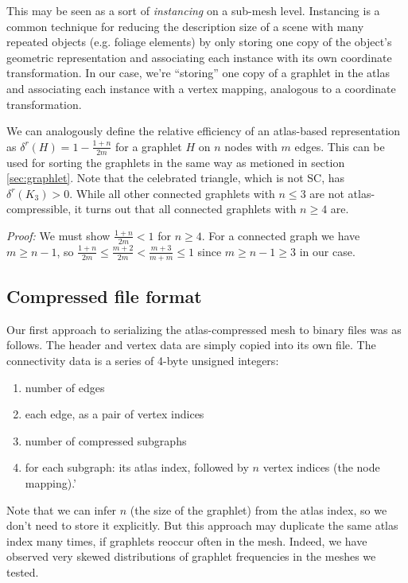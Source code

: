 \documentclass{egpubl}
\begin{document}
This may be seen as a sort of \textit{instancing} on a sub-mesh level. Instancing is a common technique for reducing the description size of a scene with many repeated objects (e.g. foliage elements) by only storing one copy of the object's geometric representation and associating each instance with its own coordinate transformation. In our case, we're ``storing'' one copy of a graphlet in the atlas and associating each instance with a vertex mapping, analogous to a coordinate transformation.

We can analogously define the relative efficiency of an atlas-based representation as
$\delta^r(H) = 1 - \frac{1+n}{2m}$ for a graphlet $H$ on $n$ nodes with $m$ edges. This can be used for sorting the graphlets in the same way as metioned in section \ref{sec:graphlet}.
Note that the celebrated triangle, which is not SC, has $\delta^r(K_3) > 0$.
While all other connected graphlets with $n \leq 3$ are not atlas-compressible, it turns out that all connected graphlets with $n \geq 4$ are.

\textit{Proof:}
We must show $\frac{1 + n}{2m} < 1$ for $n \geq 4$. For a connected graph we have $m \geq n - 1$, so $\frac{1 + n}{2m} \leq \frac{m + 2}{2m} < \frac{m + 3}{m + m} \leq 1$ since $m \geq n - 1 \geq 3$ in our case.

\subsection{Compressed file format}

Our first approach to serializing the atlas-compressed mesh to binary files was as follows. The header and vertex data are simply copied into its own file. The connectivity data is a series of 4-byte unsigned integers:
\begin{enumerate}
        \item number of edges
        \item each edge, as a pair of vertex indices
        \item number of compressed subgraphs
        \item for each subgraph: its atlas index, followed by $n$ vertex indices (the node mapping).'
\end{enumerate}
Note that we can infer $n$ (the size of the graphlet) from the atlas index, so we don't need to store it explicitly. But this approach may duplicate the same atlas index many times, if graphlets reoccur often in the mesh. Indeed, we have observed very skewed distributions of graphlet frequencies in the meshes we tested.
\end{document}
